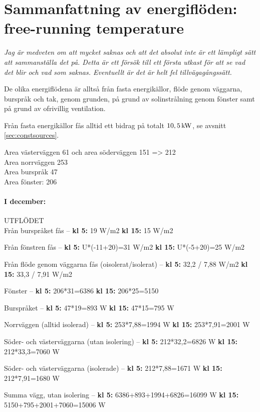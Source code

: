 \section{Sammanfattning av energiflöden: free-running temperature}

\emph{\color{red} Jag är medveten om att mycket saknas och att det absolut inte är ett lämpligt sätt att sammanställa det på. Detta är ett försök till ett första utkast för att se vad det blir och vad som saknas. Eventuellt är det är helt fel tillvägagångssätt.}

De olika energiflödena är alltså från fasta energikällor, flöde genom väggarna, burspråk och tak, genom grunden, på grund av solinstrålning genom fönster samt på grund av ofrivillig ventilation.

Från fasta energikällor fås alltid ett bidrag på totalt $\unit[10,5]{kW}$, se avsnitt \ref{sec:constsources}.


Area västerväggen 61 och area söderväggen 151 => 212\\
Area norrväggen 253\\
Area burspråk 47\\
Area fönster: 206 

\paragraph{I december:}
UTFLÖDET\\

Från burspråket fås –
\textbf{kl 5:} 19 W/m2
\textbf{kl 15:} 15 W/m2

Från fönstren fås –
\textbf{kl 5:} U*(-11+20)=31 W/m2
\textbf{kl 15:} U*(-5+20)=25 W/m2

Från flöde genom väggarna fås (oisolerat/isolerat) –
\textbf{\textbf{kl 5:}} 32,2 / 7,88 W/m2
\textbf{kl 15:} 33,3 / 7,91 W/m2

Fönster –
\textbf{kl 5:} 206*31=6386
\textbf{kl 15:} 206*25=5150

Burspråket – 
\textbf{kl 5:} 47*19=893 W
\textbf{kl 15:} 47*15=795 W

Norrväggen (alltid isolerad) –
\textbf{kl 5:} 253*7,88=1994 W
\textbf{kl 15:} 253*7,91=2001 W

Söder- och västerväggarna (utan isolering) –
\textbf{kl 5:} 212*32,2=6826 W
\textbf{kl 15:} 212*33,3=7060 W

Söder- och västerväggarna (isolerade) –
\textbf{kl 5:} 212*7,88=1671 W
\textbf{kl 15:} 212*7,91=1680 W

Summa vägg, utan isolering –
\textbf{kl 5:} 6386+893+1994+6826=16099 W
\textbf{kl 15:} 5150+795+2001+7060=15006 W


